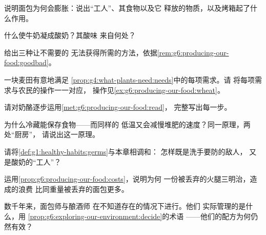 \begin{exercise}[$\star$]\label{exo:g6:producing-our-food:4}
说明面包为何会膨胀：说出“工人”、其食物以及它
释放的物质，以及烤箱起了什么作用。
\end{exercise}

\begin{exercise}[$\star$]\label{exo:g6:producing-our-food:5}
什么使牛奶凝成酸奶？其酸味
来自何处？
\end{exercise}

\begin{exercise}[$\star$]\label{exo:g6:producing-our-food:6}
给出三种让不需要的
无法获得所需的方法，依据\cref{rem:g6:producing-our-food:goodbad}。
\end{exercise}

\begin{exercise}[$\star\star$]\label{exo:g6:producing-our-food:7}
一块麦田有意地满足
\cref{prop:g4:what-plants-need:needs}中的每项需求。请
将每项需求与农民的操作一一对应，
操作见\cref{ex:g6:producing-our-food:wheat}。
\end{exercise}

\begin{exercise}[$\star\star$]\label{exo:g6:producing-our-food:8}
请对奶酪逐步运用\cref{met:g6:producing-our-food:read}，
完整写出每一步。
\end{exercise}

\begin{exercise}[$\star\star$]\label{exo:g6:producing-our-food:9}
为什么冷藏能保存食物——而同样的
低温又会减慢堆肥的速度？同一原理，两处“厨房”，
请说出这一原理。
\end{exercise}

\begin{exercise}[$\star\star$]\label{exo:g6:producing-our-food:10}
请将\cref{def:g1:healthy-habits:germs}与本章相调和：
怎样既是洗手要防的敌人，
又是酸奶的“工人”？
\end{exercise}

\begin{exercise}[$\star\star$]\label{exo:g6:producing-our-food:11}
运用\cref{prop:g6:producing-our-food:costs}，说明为何
一份被丢弃的火腿三明治，造成的浪费
比同重量被丢弃的面包更多。
\end{exercise}

\begin{exercise}[$\star\star\star$]\label{exo:g6:producing-our-food:12}
数千年来，面包师与酿酒师
在不知道存在的情况下进行。他们
实际管理的是什么，用
\cref{prop:g6:exploring-our-environment:decide}的术语
——他们的配方为何仍然有效？
\end{exercise}

